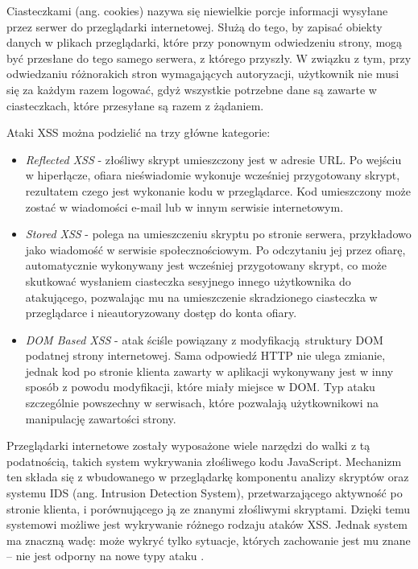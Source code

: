 \documentclass[12pt,twoside]{article}
\begin{document}
	Ciasteczkami (ang. cookies) \cite{Cookies} nazywa się niewielkie porcje informacji wysyłane przez serwer do przeglądarki internetowej. Służą do tego, by zapisać obiekty danych w plikach przeglądarki, które przy ponownym odwiedzeniu strony, mogą być przesłane do tego samego serwera, z którego przyszły. W związku z tym, przy odwiedzaniu różnorakich stron wymagających autoryzacji, użytkownik nie musi się za każdym razem logować, gdyż wszystkie potrzebne dane są zawarte w ciasteczkach, które przesyłane są razem z żądaniem. 
	
	Ataki XSS można podzielić na trzy główne kategorie:
	
	\begin{itemize}
		\item \emph{Reflected XSS} - złośliwy skrypt umieszczony jest w adresie URL. Po wejściu w hiperłącze, ofiara nieświadomie wykonuje wcześniej przygotowany skrypt, rezultatem czego jest wykonanie kodu w przeglądarce. Kod umieszczony może zostać w wiadomości e-mail lub w innym serwisie internetowym.
		\item \emph{Stored XSS} - polega na umieszczeniu skryptu po stronie serwera, przykładowo jako wiadomość w serwisie społecznościowym. Po odczytaniu jej przez ofiarę, automatycznie wykonywany jest wcześniej przygotowany skrypt, co może skutkować wysłaniem ciasteczka sesyjnego innego użytkownika do atakującego, pozwalając mu na umieszczenie skradzionego ciasteczka w przeglądarce i nieautoryzowany dostęp do konta ofiary.
		\item \emph{DOM Based XSS} - atak ściśle powiązany z modyfikacją struktury DOM podatnej strony internetowej. Sama odpowiedź HTTP nie ulega zmianie, jednak kod po stronie klienta zawarty w aplikacji wykonywany jest w inny sposób z powodu modyfikacji, które miały miejsce w DOM. Typ ataku szczególnie powszechny w serwisach, które pozwalają użytkownikowi na manipulację zawartości strony. 
	\end{itemize}
	
Przeglądarki internetowe zostały wyposażone wiele narzędzi do walki z tą podatnością, takich system wykrywania złośliwego kodu JavaScript. Mechanizm ten składa się z wbudowanego w przeglądarkę komponentu analizy skryptów oraz systemu IDS (ang. Intrusion Detection System), przetwarzającego aktywność po stronie klienta, i porównującego ją ze znanymi złośliwymi skryptami. Dzięki temu systemowi możliwe jest wykrywanie różnego rodzaju ataków XSS. Jednak system ma znaczną wadę: może wykryć tylko sytuacje, których zachowanie jest mu znane -- nie jest odporny na nowe typy ataku \cite{XSSProtection}. 
\end{document}
